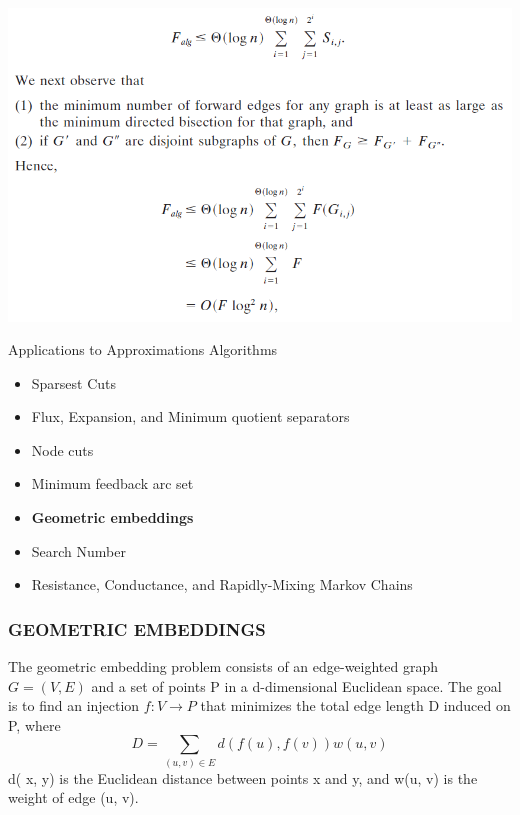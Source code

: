 \begin{frame}
\centering
\includegraphics[width=\textwidth]{figs/Feedback_arc_set.png}
\end{frame}


\begin{frame}[t]
\begin{block}{Applications to Approximations Algorithms}
	\begin{itemize}
			\item Sparsest Cuts
            \item Flux, Expansion, and Minimum quotient separators
            \item Node cuts
			\item Minimum feedback arc set
            \item \textbf{Geometric embeddings}
        	\item Search Number
            \item Resistance, Conductance, and Rapidly-Mixing Markov Chains
	 \end{itemize} 
\end{block}
\end{frame}


\begin{frame}
\frametitle{GEOMETRIC EMBEDDINGS}
The geometric embedding problem consists of
an edge-weighted graph $G=(V, E)$ and a set of points P in a d-dimensional
Euclidean space. 
The goal is to find an injection $f: V \rightarrow P$ that minimizes the
total edge length D induced on P, where
$$D =\sum_{
(u,v)\in E}
d(f(u), f(v))w(u,v)$$
d( x, y) is the Euclidean distance between points x and y, and w(u, v) is the
weight of edge (u, v). 
\end{frame}

